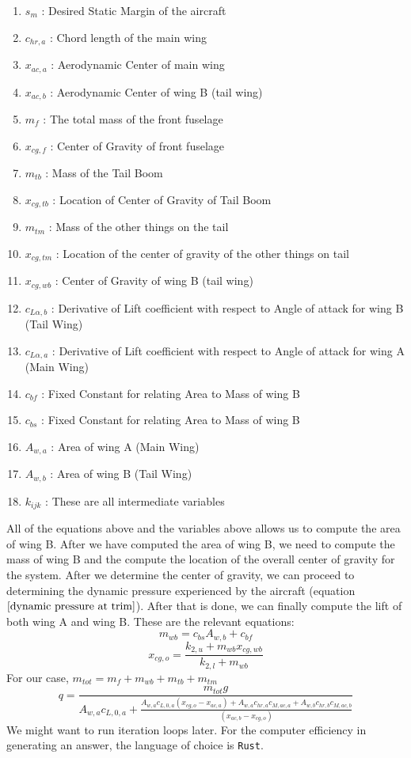 \begin{enumerate}
\item $s_{m}$ : Desired Static Margin of the aircraft
\item $c_{hr,a}$ : Chord length of the main wing
\item $x_{ac,a}$ : Aerodynamic Center of main wing
\item $x_{ac,b}$ : Aerodynamic Center of wing B (tail wing)
\item $m_{f}$ : The total mass of the front fuselage
\item $x_{cg,f}$ : Center of Gravity of front fuselage
\item $m_{tb}$ : Mass of the Tail Boom
\item $x_{cg,tb}$ : Location of Center of Gravity of Tail Boom
\item $m_{tm}$ : Mass of the other things on the tail
\item $x_{cg,tm}$ : Location of the center of gravity of the other things on tail
\item $x_{cg,wb}$ : Center of Gravity of wing B (tail wing)
\item $c_{L\alpha,b}$ : Derivative of Lift coefficient with respect to Angle of attack for wing B (Tail Wing)
\item $c_{L\alpha,a}$ : Derivative of Lift coefficient with respect to Angle of attack for wing A (Main Wing)
\item $c_{bf}$ : Fixed Constant for relating Area to Mass of wing B
\item $c_{bs}$ : Fixed Constant for relating Area to Mass of wing B
\item $A_{w,a}$ : Area of wing A (Main Wing)
\item $A_{w,b}$ : Area of wing B (Tail Wing)
\item $k_{ijk}$ : These are all intermediate variables
\end{enumerate}
All of the equations above and the variables above allows us to compute the area of wing B. After we have computed the area of wing B, we need to compute the mass of wing B and the compute the location of the overall center of gravity for the system. After we determine the center of gravity, we can proceed to determining the dynamic pressure experienced by the aircraft (equation $\ref{dynamic pressure at trim}$). After that is done, we can finally compute the lift of both wing A and wing B. These are the relevant equations:
$$m_{wb} = c_{bs}A_{w,b} + c_{bf}$$
$$x_{cg,o} = \frac{ k_{2,u} + m_{wb}x_{cg,wb}}{k_{2,l} + m_{wb}}$$
For our case, $m_{tot} = m_{f} + m_{wb} + m_{tb} + m_{tm}$
$$q = \frac{m_{tot}g}{\displaystyle  A_{w,a}c_{L,0,a} + \frac{A_{w,a}c_{L,0,a}(x_{cg,o}-x_{ac,a}) + A_{w,a}c_{hr,a}c_{M,ac,a} + A_{w,b}c_{hr,b}c_{M,ac,b}}{(x_{ac,b}-x_{cg,o})} } $$
We might want to run iteration loops later. For the computer efficiency in generating an answer, the language of choice is \texttt{Rust}.

